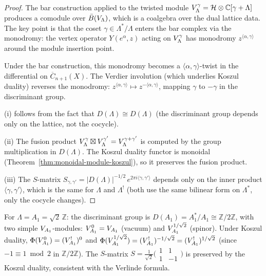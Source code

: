 \begin{proof}
The bar construction applied to the twisted module
$V_\Lambda^\gamma = \mathcal{H} \otimes \mathbb{C}[\gamma + \Lambda]$
produces a comodule over $\bar{B}(V_\Lambda)$, which is a
coalgebra over the dual lattice data.  The key point is that the
coset $\gamma \in \Lambda^*/\Lambda$ enters the bar complex via
the monodromy: the vertex operator $Y(e^\alpha, z)$ acting on
$V_\Lambda^\gamma$ has monodromy $z^{\langle\alpha,\gamma\rangle}$
around the module insertion point.

Under the bar construction, this monodromy becomes a
$\langle\alpha,\gamma\rangle$-twist in the differential on
$\overline{C}_{n+1}(X)$.  The Verdier involution (which underlies
Koszul duality) reverses the monodromy:
$z^{\langle\alpha,\gamma\rangle} \mapsto
z^{-\langle\alpha,\gamma\rangle}$,
mapping $\gamma$ to $-\gamma$ in the discriminant group.

(i) follows from the fact that $D(\Lambda) \cong D(\Lambda)$
(the discriminant group depends only on the lattice, not the
cocycle).

(ii) The fusion product $V_\Lambda^\gamma \boxtimes
V_\Lambda^{\gamma'} = V_\Lambda^{\gamma+\gamma'}$ is
computed by the group multiplication in $D(\Lambda)$.  The
Koszul duality functor is monoidal
(Theorem~\ref{thm:monoidal-module-koszul}), so it preserves
the fusion product.

(iii) The $S$-matrix $S_{\gamma,\gamma'} =
|D(\Lambda)|^{-1/2}\, e^{2\pi i\langle\gamma,\gamma'\rangle}$
depends only on the inner product $\langle\gamma,\gamma'\rangle$,
which is the same for $\Lambda$ and $\Lambda^!$ (both use the
same bilinear form on $\Lambda^*$, only the cocycle changes).
\end{proof}

\begin{example}
\label{ex:lattice-module-A1}
For $\Lambda = A_1 = \sqrt{2}\,\mathbb{Z}$:
the discriminant group is $D(A_1) = A_1^*/A_1 \cong \mathbb{Z}/2\mathbb{Z}$,
with two simple $V_{A_1}$-modules:
$V_{A_1}^0 = V_{A_1}$ (vacuum) and
$V_{A_1}^{1/\sqrt{2}}$ (spinor).  Under Koszul duality,
$\Phi(V_{A_1}^0) = (V_{A_1}^!)^0$ and
$\Phi(V_{A_1}^{1/\sqrt{2}}) = (V_{A_1}^!)^{-1/\sqrt{2}}
= (V_{A_1}^!)^{1/\sqrt{2}}$ (since $-1 \equiv 1 \bmod 2$
in $\mathbb{Z}/2\mathbb{Z}$).  The $S$-matrix
$S = \frac{1}{\sqrt{2}}\bigl(\begin{smallmatrix}1 & 1 \\
1 & -1\end{smallmatrix}\bigr)$
is preserved by the Koszul duality, consistent with the
Verlinde formula.
\end{example}

